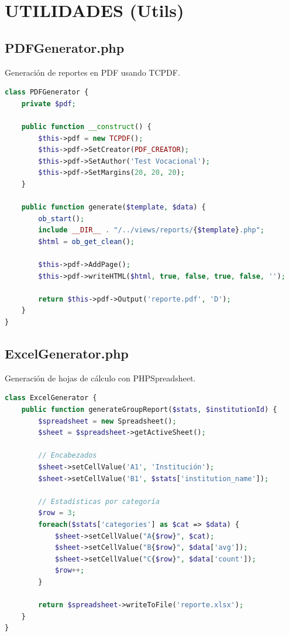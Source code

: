 \documentclass[12pt, a4paper]{report}
\begin{document}
\chapter{UTILIDADES (Utils)}

\section{PDFGenerator.php}
Generación de reportes en PDF usando TCPDF.
\begin{lstlisting}[language=PHP]
class PDFGenerator {
    private $pdf;
    
    public function __construct() {
        $this->pdf = new TCPDF();
        $this->pdf->SetCreator(PDF_CREATOR);
        $this->pdf->SetAuthor('Test Vocacional');
        $this->pdf->SetMargins(20, 20, 20);
    }
    
    public function generate($template, $data) {
        ob_start();
        include __DIR__ . "/../views/reports/{$template}.php";
        $html = ob_get_clean();
        
        $this->pdf->AddPage();
        $this->pdf->writeHTML($html, true, false, true, false, '');
        
        return $this->pdf->Output('reporte.pdf', 'D');
    }
}
\end{lstlisting}

\section{ExcelGenerator.php}
Generación de hojas de cálculo con PHPSpreadsheet.
\begin{lstlisting}[language=PHP]
class ExcelGenerator {
    public function generateGroupReport($stats, $institutionId) {
        $spreadsheet = new Spreadsheet();
        $sheet = $spreadsheet->getActiveSheet();
        
        // Encabezados
        $sheet->setCellValue('A1', 'Institución');
        $sheet->setCellValue('B1', $stats['institution_name']);
        
        // Estadísticas por categoría
        $row = 3;
        foreach($stats['categories'] as $cat => $data) {
            $sheet->setCellValue("A{$row}", $cat);
            $sheet->setCellValue("B{$row}", $data['avg']);
            $sheet->setCellValue("C{$row}", $data['count']);
            $row++;
        }
        
        return $spreadsheet->writeToFile('reporte.xlsx');
    }
}
\end{lstlisting}
\end{document}
